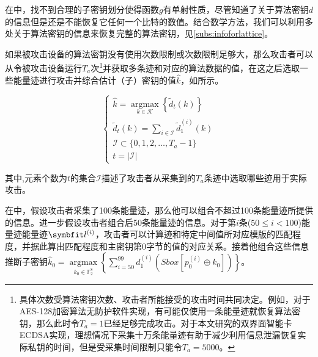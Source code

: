 {	\begin{example}
		在中，找不到合理的子密钥划分使得函数$g$有单射性质，尽管知道了关于算法密钥$d$的信息但是还是不能恢复它任何一个比特的数值。结合数学方法，我们可以利用多处关于算法密钥的信息来恢复完整的算法密钥，见\ref{subs:infoforlattice}。
	\end{example}
	
	如果被攻击设备的算法密钥没有使用次数限制或次数限制足够大，那么攻击者可以从令被攻击设备运行$T_a$次\footnote{具体次数受算法密钥次数、攻击者所能接受的攻击时间共同决定。例如，对于AES-128加密算法无防护软件实现，有可能仅使用一条能量迹就恢复算法密钥，那么此时令$T_a=1$已经足够完成攻击。对于本文研究的双界面智能卡ECDSA实现，理想情况下采集十万条能量迹有助于减少利用信息泄漏恢复实际私钥的时间，但是受采集时间限制只能令$T_a=5000$。}并获取多条迹和对应的算法数据的值，在这之后选取一些能量迹进行攻击并综合估计（子）密钥的值$\hat k$，如所示。
	
	\begin{equation}\label{eq:ttracek}
		\begin{cases}
			\hat k=\mathop{\mathrm{argmax}}\limits_{k\in\mathcal K}\left\lbrace \tilde d_t(k)\right\rbrace \\
			\tilde d_t(k)=\sum\limits_{i\in \mathcal I}\tilde d^{(i)}_1(k)\\
			\mathcal I\subset \{0,1,2,\dots,T_a-1\}\\
			t=\vert\mathcal I\vert
		\end{cases}
	\end{equation}
	
	\noindent 其中,元素个数为$t$的集合$\mathcal I$描述了攻击者从采集到的$T_a$条迹中选取哪些迹用于实际攻击。
	
	\begin{example}
		在中，假设攻击者采集了100条能量迹，那么他可以组合不超过100条能量迹所提供的信息。进一步假设攻击者组合后50条能量迹的信息。对于第$i$条($50\le i<100$)能量迹能量迹$\Vector {l^{(i)}}$，攻击者可以计算迹和特定中间值所对应模版的匹配程度，并据此算出匹配程度和主密钥第0字节的值的对应关系。接着他组合这些信息推断子密钥$\hat k_0=\mathop{\mathrm{argmax}}\limits_{k_0\in\mathbb F_2^8}\left\lbrace \sum\limits_{i=50}^{99}d_1^{(i)}\left( Sbox[p^{(i)}_0\oplus k_0]\right)\right\rbrace $。
	\end{example}
	
}
